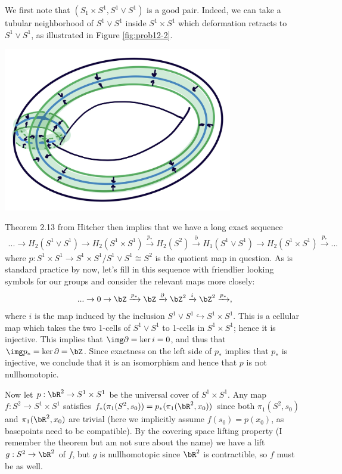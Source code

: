\begin{homework}[e]
  \begin{prf}
    We first note that $(S_1\times S^1, S^1\vee S^1)$ is a good pair. Indeed, we can take a tubular neighborhood of $S^1\vee S^1$ inside $S^1\times S^1$ which deformation retracts to $S^1\vee S^1$, as illustrated in Figure \ref{fig:prob12-2}.
    \begin{center}
      \includegraphics[width=10cm]{figures/hwk10-fig2.png}
      \label{fig:prob12-2}
    \end{center}
    Theorem 2.13 from Hitcher then implies that we have a long exact sequence
    \begin{align*}
      ...\to H_2(S^1\vee S^1) \to H_2(S^1\times S^1) \xrightarrow{p_*} H_2(S^2) \xrightarrow{\partial} H_1(S^1\vee S^1)\to H_2(S^1\times S^1) \xrightarrow{p_*} ...
    \end{align*}
    where $p:S^1\times S^1\to S^1\times S^1/S^1\vee S^1 \cong S^2$ is the quotient map in question. As is standard practice by now, let's fill in this sequence with friendlier looking symbols for our groups and consider the relevant maps more closely:
    \begin{align*}
      ...\to 0 \to \bZ \xrightarrow{p_*} \bZ \xrightarrow{\partial} \bZ^2 \xrightarrow{i} \bZ^2 \xrightarrow{p_*},
    \end{align*}
    where $i$ is the map induced by the inclusion $S^1\vee S^1 \hookrightarrow S^1 \times S^1$. This is a cellular map which takes the two 1-cells of $S^1\vee S^1$ to 1-cells in $S^1\times S^1$; hence it is injective. This implies that $\img \partial = \ker i = 0$, and thus that $\img p_* = \ker \partial = \bZ$. Since exactness on the left side of $p_*$ implies that $p_*$ is injective, we conclude that it is an isomorphism and hence that $p$ is not nullhomotopic.

    Now let $p:\bR^2 \to S^1\times S^1$ be the universal cover of $S^1\times S^1$. Any map $f:S^2\to S^1\times S^1$ satisfies $f_*(\pi_1(S^2,s_0)) = p_*(\pi_1(\bR^2,x_0))$ since both $\pi_1(S^2,s_0)$ and $\pi_1(\bR^2,x_0)$ are trivial (here we implicitly assume $f(s_0) = p(x_0)$, as basepoints need to be compatible). By the covering space lifting property (I remember the theorem but am not sure about the name) we have a lift $g:S^2 \to \bR^2$ of $f$, but $g$ is nullhomotopic since $\bR^2$ is contractible, so $f$ must be as well.
  \end{prf}
\end{homework}
